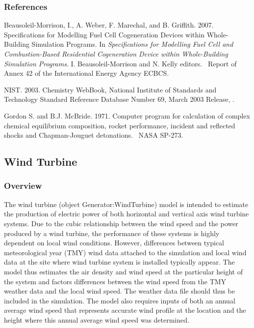 \subsubsection{References}\label{references-024}

Beausoleil-Morrison, I., A. Weber, F. Marechal, and B. Griffith. 2007. Specifications for Modelling Fuel Cell Cogeneration Devices within Whole-Building Simulation Programs. In \emph{Specifications for Modelling Fuel Cell and Combustion-Based Residential Cogeneration Device within Whole-Building Simulation Programs}. I. Beausoleil-Morrison and N. Kelly editors.~ Report of Annex 42 of the International Energy Agency ECBCS.

NIST. 2003. Chemistry WebBook, National Institute of Standards and Technology Standard Reference Database Number 69, March 2003 Release, .

Gordon S. and B.J. McBride. 1971. Computer program for calculation of complex chemical equilibrium composition, rocket performance, incident and reflected shocks and Chapman-Jouguet detonations.~ NASA SP-273.

\subsection{Wind Turbine}\label{wind-turbine}

\subsubsection{Overview}\label{overview-017}

The wind turbine (object Generator:WindTurbine) model is intended to estimate the production of electric power of both horizontal and vertical axis wind turbine systems. Due to the cubic relationship between the wind speed and the power produced by a wind turbine, the performance of these systems is highly dependent on local wind conditions. However, differences between typical meteorological year (TMY) wind data attached to the simulation and local wind data at the site where wind turbine system is installed typically appear. The model thus estimates the air density and wind speed at the particular height of the system and factors differences between the wind speed from the TMY weather data and the local wind speed. The weather data file should thus be included in the simulation. The model also requires inputs of both an annual average wind speed that represents accurate wind profile at the location and the height where this annual average wind speed was determined.

